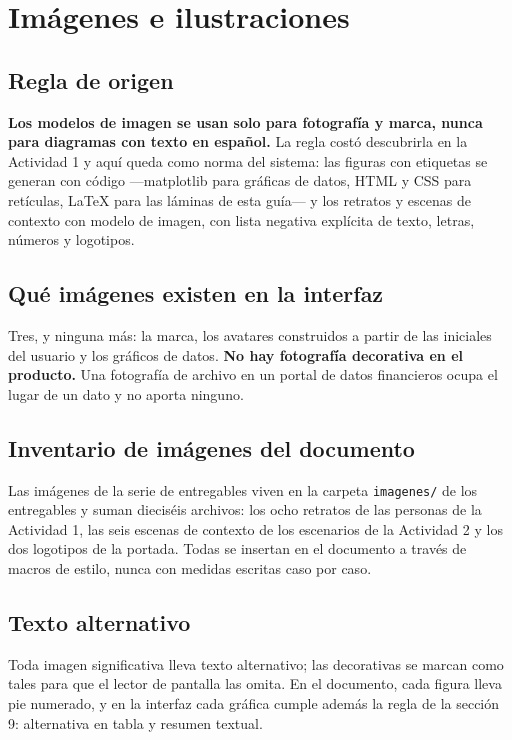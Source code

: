 \section{Imágenes e ilustraciones}

\subsection{Regla de origen}

\textbf{Los modelos de imagen se usan solo para fotografía y marca, nunca para diagramas con texto en español.} La regla costó descubrirla en la Actividad 1 y aquí queda como norma del sistema: las figuras con etiquetas se generan con código ---matplotlib para gráficas de datos, HTML y CSS para retículas, LaTeX para las láminas de esta guía--- y los retratos y escenas de contexto con modelo de imagen, con lista negativa explícita de texto, letras, números y logotipos.

\subsection{Qué imágenes existen en la interfaz}

Tres, y ninguna más: la marca, los avatares construidos a partir de las iniciales del usuario y los gráficos de datos. \textbf{No hay fotografía decorativa en el producto.} Una fotografía de archivo en un portal de datos financieros ocupa el lugar de un dato y no aporta ninguno.

\subsection{Inventario de imágenes del documento}

Las imágenes de la serie de entregables viven en la carpeta \texttt{imagenes/} de los entregables y suman dieciséis archivos: los ocho retratos de las personas de la Actividad 1, las seis escenas de contexto de los escenarios de la Actividad 2 y los dos logotipos de la portada. Todas se insertan en el documento a través de macros de estilo, nunca con medidas escritas caso por caso.

\subsection{Texto alternativo}

Toda imagen significativa lleva texto alternativo; las decorativas se marcan como tales para que el lector de pantalla las omita. En el documento, cada figura lleva pie numerado, y en la interfaz cada gráfica cumple además la regla de la sección 9: alternativa en tabla y resumen textual.

